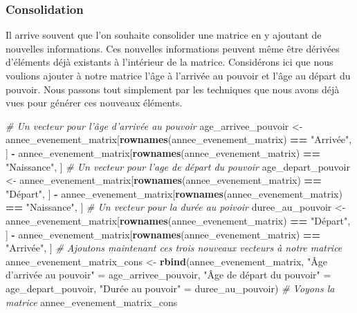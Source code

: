 \documentclass[]{book}
\newenvironment{Shaded}{\begin{snugshade}}{\end{snugshade}}
\newcommand{\KeywordTok}[1]{\textcolor[rgb]{0.13,0.29,0.53}{\textbf{#1}}}
\newcommand{\StringTok}[1]{\textcolor[rgb]{0.31,0.60,0.02}{#1}}
\newcommand{\CommentTok}[1]{\textcolor[rgb]{0.56,0.35,0.01}{\textit{#1}}}
\newcommand{\OperatorTok}[1]{\textcolor[rgb]{0.81,0.36,0.00}{\textbf{#1}}}
\newcommand{\NormalTok}[1]{#1}
\begin{document}
\subsubsection{Consolidation}\label{consolidation}

Il arrive souvent que l'on souhaite consolider une matrice en y ajoutant
de nouvelles informations. Ces nouvelles informations peuvent même être
dérivées d'éléments déjà existants à l'intérieur de la matrice.
Considérons ici que nous voulions ajouter à notre matrice l'âge à
l'arrivée au pouvoir et l'âge au départ du pouvoir. Nous passons tout
simplement par les techniques que nous avons déjà vues pour générer ces
nouveaux éléments.

\begin{Shaded}
\begin{Highlighting}[]
\CommentTok{# Un vecteur pour l'âge d'arrivée au pouvoir}
\NormalTok{age_arrivee_pouvoir <-}\StringTok{ }
\StringTok{  }\NormalTok{annee_evenement_matrix[}\KeywordTok{rownames}\NormalTok{(annee_evenement_matrix) }\OperatorTok{==}\StringTok{ "Arrivée"}\NormalTok{, ] }\OperatorTok{-}\StringTok{ }
\StringTok{  }\NormalTok{annee_evenement_matrix[}\KeywordTok{rownames}\NormalTok{(annee_evenement_matrix) }\OperatorTok{==}\StringTok{ "Naissance"}\NormalTok{, ]}
\CommentTok{# Un vecteur pour l'age de départ du pouvoir}
\NormalTok{age_depart_pouvoir <-}\StringTok{ }
\StringTok{  }\NormalTok{annee_evenement_matrix[}\KeywordTok{rownames}\NormalTok{(annee_evenement_matrix) }\OperatorTok{==}\StringTok{ "Départ"}\NormalTok{, ] }\OperatorTok{-}\StringTok{ }
\StringTok{  }\NormalTok{annee_evenement_matrix[}\KeywordTok{rownames}\NormalTok{(annee_evenement_matrix) }\OperatorTok{==}\StringTok{ "Naissance"}\NormalTok{, ]}
\CommentTok{# Un vecteur pour la durée au poivoir}
\NormalTok{duree_au_pouvoir <-}\StringTok{ }
\StringTok{  }\NormalTok{annee_evenement_matrix[}\KeywordTok{rownames}\NormalTok{(annee_evenement_matrix) }\OperatorTok{==}\StringTok{ "Départ"}\NormalTok{, ] }\OperatorTok{-}\StringTok{ }
\StringTok{  }\NormalTok{annee_evenement_matrix[}\KeywordTok{rownames}\NormalTok{(annee_evenement_matrix) }\OperatorTok{==}\StringTok{ "Arrivée"}\NormalTok{, ]}
\CommentTok{# Ajoutons maintenant ces trois nouveaux vecteurs à notre matrice}
\NormalTok{annee_evenement_matrix_cons <-}\StringTok{ }\KeywordTok{rbind}\NormalTok{(annee_evenement_matrix, }
                                     \StringTok{"Âge d'arrivée au pouvoir"}\NormalTok{ =}\StringTok{  }\NormalTok{age_arrivee_pouvoir, }
                                     \StringTok{"Âge de départ du pouvoir"}\NormalTok{ =}\StringTok{ }\NormalTok{age_depart_pouvoir,}
                                     \StringTok{"Durée au pouvoir"}\NormalTok{ =}\StringTok{ }\NormalTok{duree_au_pouvoir)}
\CommentTok{# Voyons la matrice}
\NormalTok{annee_evenement_matrix_cons}
\end{Highlighting}
\end{Shaded}
\end{document}
